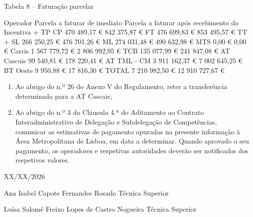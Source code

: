 \documentclass[
  a4paper,
]{article}
\providecommand{\tightlist}{%
  \setlength{\itemsep}{0pt}\setlength{\parskip}{0pt}}
\begin{document}
Tabela 8 -- Faturação parcelar

Operador Parcela a faturar de imediato Parcela a faturar após
recebimento do Incentiva + TP CP 470 489,17 € 842 375,87 € FT 476 699,83
€ 853 495,57 € TT + SL 266 250,25 € 476 701,26 € ML 274 031,48 € 490
632,98 € MTS 0,00 € 0,00 € Carris 1 567 779,72 € 2 806 992,95 € TCB 135
077,99 € 241 847,08 € AT Cascais 99 540,81 € 178 220,41 € AT TML - CM 3
911 162,37 € 7 002 645,25 € BT Oeste 9 950,88 € 17 816,30 € TOTAL 7 210
982,50 € 12 910 727,67 €

\begin{enumerate}
\def\labelenumi{\arabic{enumi})}
\setcounter{enumi}{5}
\tightlist
\item
  Ao abrigo do n.º 26 do Anexo V do Regulamento, reter a transferência
  determinada para a AT Cascais;
\item
  Ao abrigo do n.º 3 da Cláusula 4.ª do Aditamento ao Contrato
  Interadministrativo de Delegação e Subdelegação de Competências,
  comunicar as estimativas de pagamento apuradas na presente informação
  à Área Metropolitana de Lisboa, em data a determinar. Quando aprovado
  o seu pagamento, os operadores e respetivas autoridades deverão ser
  notificados dos respetivos valores.
\end{enumerate}

XX/XX/2026

Ana Isabel Capote Fernandes Rosado Técnica Superior

Luísa Salomé Freixo Lopes de Castro Nogueira Técnica Superior
\end{document}
